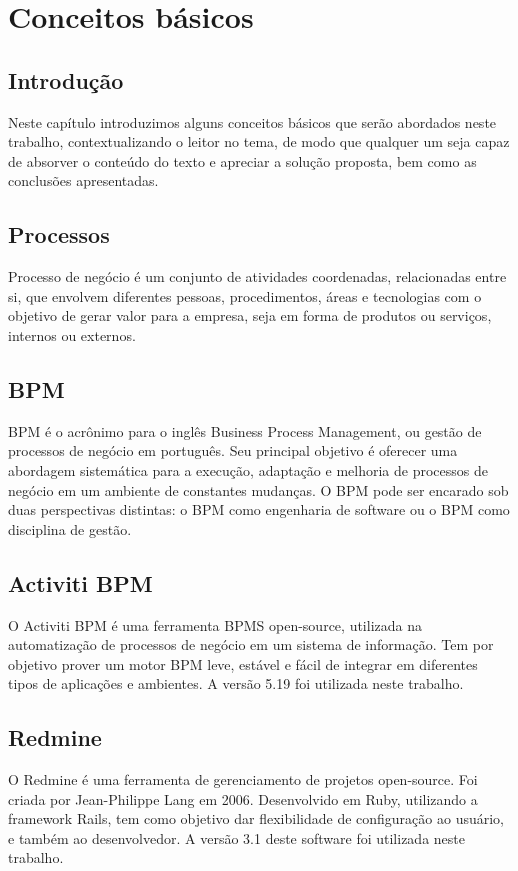 \chapter{Conceitos básicos}\label{chp:conceitos_basicos}

\section{Introdução}\label{sec:conceitos_basicos-introducao}
Neste capítulo introduzimos alguns conceitos básicos que serão abordados neste trabalho, contextualizando o leitor no tema, de modo que qualquer um seja capaz de absorver o conteúdo do texto e apreciar a solução proposta, bem como as conclusões apresentadas.

\section{Processos}\label{sec:conceitos_basicos-processos}
Processo de negócio é um conjunto de atividades coordenadas, relacionadas entre si, que envolvem diferentes pessoas, procedimentos, áreas e tecnologias com o objetivo de gerar valor para a empresa, seja em forma de produtos ou serviços, internos ou externos.

\section{BPM}\label{sec:conceitos_basicos-bpm}
BPM é o acrônimo para o inglês Business Process Management, ou gestão de processos de negócio em português. Seu principal objetivo é oferecer uma abordagem sistemática para a execução, adaptação e melhoria de processos de negócio em um ambiente de constantes mudanças. O BPM pode ser encarado sob duas perspectivas distintas: o BPM como engenharia de software ou o BPM como disciplina de gestão.

\section{Activiti BPM}\label{sec:conceitos_basicos-activiti}

O Activiti BPM é uma ferramenta BPMS open-source, utilizada na automatização de processos de negócio em um sistema de informação. Tem por objetivo prover um motor BPM leve, estável e fácil de integrar em diferentes tipos de aplicações e ambientes. A versão 5.19 foi utilizada neste trabalho.


\section{Redmine}\label{sec:conceitos_basicos-redmine}
O Redmine é uma ferramenta de gerenciamento de projetos open-source. Foi criada por Jean-Philippe Lang em 2006. Desenvolvido em Ruby, utilizando a framework Rails, tem como objetivo dar flexibilidade de configuração ao usuário, e também ao desenvolvedor. A versão 3.1 deste software foi utilizada neste trabalho.


